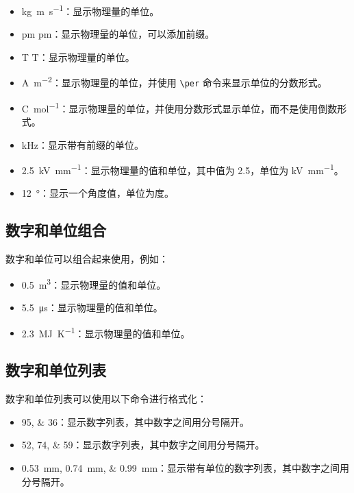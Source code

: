 \begin{itemize}
  \item \si{kg.m.s^{-1}}：显示物理量的单位。
  \item \si{\pico\meter} $\si{\pico\meter}$：显示物理量的单位，可以添加前缀。
  \item \si{\tesla} $\si{\tesla}$：显示物理量的单位。
  \item \si{\ampere\per\meter\squared}：显示物理量的单位，并使用 \verb|\per| 命令来显示单位的分数形式。
  \item \si[per-mode=fraction]{\coulomb\per\mole}：显示物理量的单位，并使用分数形式显示单位，而不是使用倒数形式。
  \item \si{\kilo\hertz}：显示带有前缀的单位。
  \item \SI{2.5}{\kilo\volt\per\milli\meter}：显示物理量的值和单位，其中值为 2.5，单位为 \si{\kilo\volt\per\milli\meter}。
  \item \SI{12}{\degree}：显示一个角度值，单位为度。
\end{itemize}

\subsection*{数字和单位组合}

数字和单位可以组合起来使用，例如：

\begin{itemize}
  \item \SI{0.5}{\metre\cubed}：显示物理量的值和单位。
  \item \SI{5.5}{\micro\second}：显示物理量的值和单位。
  \item \SI{2.3}{\mega\joule\per\kelvin}：显示物理量的值和单位。
\end{itemize}

\subsection*{数字和单位列表}

数字和单位列表可以使用以下命令进行格式化：

\begin{itemize}
  \item \numlist{95;36}：显示数字列表，其中数字之间用分号隔开。
  \item \numlist{52;74;59}：显示数字列表，其中数字之间用分号隔开。
  \item \SIlist{0.53;0.74;0.99}{\milli\metre}：显示带有单位的数字列表，其中数字之间用分号隔开。
\end{itemize}

